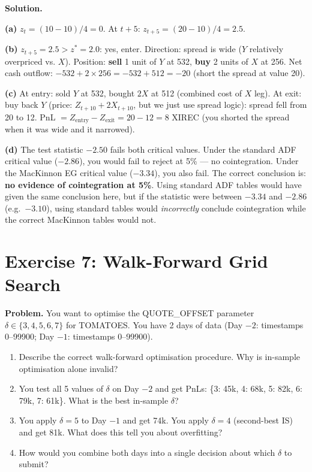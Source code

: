 \documentclass[12pt,a4paper,openany]{report}
\theoremstyle{definition}
\begin{document}
\textbf{Solution.}

\textbf{(a)} $z_t = (10 - 10)/4 = 0$. At $t+5$: $z_{t+5} = (20 - 10)/4 = 2.5$.

\textbf{(b)} $z_{t+5} = 2.5 > z^* = 2.0$: yes, enter. Direction: spread is wide ($Y$ relatively overpriced vs. $X$). Position: \textbf{sell} 1 unit of $Y$ at 532, \textbf{buy} 2 units of $X$ at 256. Net cash outflow: $-532 + 2 \times 256 = -532 + 512 = -20$ (short the spread at value 20).

\textbf{(c)} At entry: sold $Y$ at 532, bought $2X$ at 512 (combined cost of $X$ leg). At exit: buy back $Y$ (price: $Z_{t+10} + 2X_{t+10}$, but we just use spread logic): spread fell from 20 to 12. PnL $= Z_{\text{entry}} - Z_{\text{exit}} = 20 - 12 = 8$ XIREC (you shorted the spread when it was wide and it narrowed).

\textbf{(d)} The test statistic $-2.50$ fails both critical values. Under the standard ADF critical value ($-2.86$), you would fail to reject at 5\% — no cointegration. Under the MacKinnon EG critical value ($-3.34$), you also fail. The correct conclusion is: \textbf{no evidence of cointegration at 5\%}. Using standard ADF tables would have given the same conclusion here, but if the statistic were between $-3.34$ and $-2.86$ (e.g.\ $-3.10$), using standard tables would \emph{incorrectly} conclude cointegration while the correct MacKinnon tables would not.

\section*{Exercise 7: Walk-Forward Grid Search}

\textbf{Problem.} You want to optimise the QUOTE\_OFFSET parameter $\delta \in \{3, 4, 5, 6, 7\}$ for TOMATOES. You have 2 days of data (Day $-2$: timestamps 0--99900; Day $-1$: timestamps 0--99900).

\begin{enumerate}[label=(\alph*)]
  \item Describe the correct walk-forward optimisation procedure. Why is in-sample optimisation alone invalid?
  \item You test all 5 values of $\delta$ on Day $-2$ and get PnLs: \{3: 45k, 4: 68k, 5: 82k, 6: 79k, 7: 61k\}. What is the best in-sample $\delta$?
  \item You apply $\delta = 5$ to Day $-1$ and get 74k. You apply $\delta = 4$ (second-best IS) and get 81k. What does this tell you about overfitting?
  \item How would you combine both days into a single decision about which $\delta$ to submit?
\end{enumerate}
\end{document}
